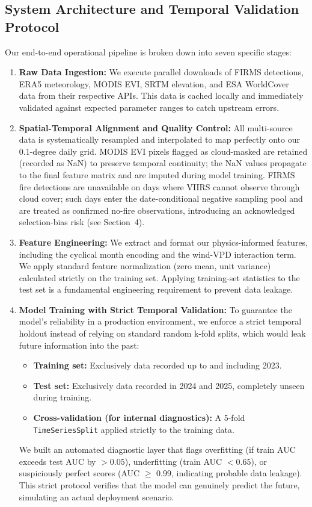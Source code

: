 \subsection{System Architecture and Temporal Validation Protocol}

Our end-to-end operational pipeline is broken down into seven specific stages:

\begin{enumerate}
    \item \textbf{Raw Data Ingestion:} We execute parallel downloads of FIRMS detections, ERA5 meteorology, MODIS EVI, SRTM elevation, and ESA WorldCover data from their respective APIs. This data is cached locally and immediately validated against expected parameter ranges to catch upstream errors.
    
    \item \textbf{Spatial-Temporal Alignment and Quality Control:} All multi-source data is systematically resampled and interpolated to map perfectly onto our 0.1-degree daily grid. MODIS EVI pixels flagged as cloud-masked are retained (recorded as NaN) to preserve temporal continuity; the NaN values propagate to the final feature matrix and are imputed during model training. FIRMS fire detections are unavailable on days where VIIRS cannot observe through cloud cover; such days enter the date-conditional negative sampling pool and are treated as confirmed no-fire observations, introducing an acknowledged selection-bias risk (see Section~4).
    
    \item \textbf{Feature Engineering:} We extract and format our physics-informed features, including the cyclical month encoding and the wind-VPD interaction term. We apply standard feature normalization (zero mean, unit variance) calculated strictly on the training set. Applying training-set statistics to the test set is a fundamental engineering requirement to prevent data leakage.
    
    \item \textbf{Model Training with Strict Temporal Validation:} To guarantee the model's reliability in a production environment, we enforce a strict temporal holdout instead of relying on standard random k-fold splits, which would leak future information into the past:
    \begin{itemize}
        \item \textbf{Training set:} Exclusively data recorded up to and including 2023.
        \item \textbf{Test set:} Exclusively data recorded in 2024 and 2025, completely unseen during training.
        \item \textbf{Cross-validation (for internal diagnostics):} A 5-fold \texttt{TimeSeriesSplit} applied strictly to the training data.
    \end{itemize}
    We built an automated diagnostic layer that flags overfitting (if train AUC exceeds test AUC by $> 0.05$), underfitting (train AUC $< 0.65$), or suspiciously perfect scores (AUC $\geq$ 0.99, indicating probable data leakage). This strict protocol verifies that the model can genuinely predict the future, simulating an actual deployment scenario.
    

\end{enumerate}
